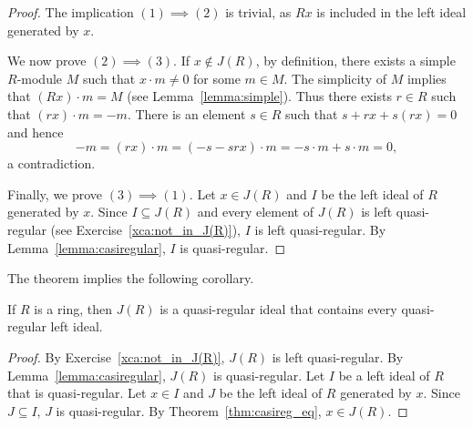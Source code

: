 \begin{proof}
	The implication $(1)\implies(2)$ is trivial, as $Rx$ is included in the left ideal 
	generated by $x$.  
	
	We now prove $(2)\implies(3)$. If
	$x\not\in J(R)$, by definition, there exists a simple 
	$R$-module $M$ such that $x\cdot m\ne 0$ for some $m\in M$. The simplicity of $M$ implies
	that $(Rx)\cdot m=M$ (see Lemma~\ref{lemma:simple}). Thus there exists $r\in R$ such that $(rx)\cdot m=-m$. There is an element 
	$s\in R$ such that $s+rx+s(rx)=0$ and hence 
	\[
	-m=(rx)\cdot m=(-s-srx)\cdot m=-s\cdot m+s\cdot m=0,
	\]
	a contradiction. 
	
	Finally, we prove $(3)\implies(1)$. Let $x\in J(R)$ and $I$ be the left ideal of $R$ 
 generated by $x$. Since $I\subseteq J(R)$ and every element of $J(R)$ is left quasi-regular (see Exercise~\ref{xca:not_in_J(R)}), 
 $I$ is left quasi-regular. By Lemma~\ref{lemma:casiregular}, $I$ is quasi-regular. 
\end{proof}

The theorem implies the following corollary. 

\begin{corollary}
	If $R$ is a ring, then $J(R)$ is a quasi-regular ideal that contains every 
	quasi-regular left ideal. 
\end{corollary}

\begin{proof}
    By Exercise~\ref{xca:not_in_J(R)}, $J(R)$ is left quasi-regular. By Lemma~\ref{lemma:casiregular}, $J(R)$ is quasi-regular. 
    Let $I$ be a left ideal of $R$ that is quasi-regular. Let $x\in I$ and $J$ be the left
    ideal of $R$ generated by $x$. Since $J\subseteq I$, $J$ is quasi-regular. By Theorem~\ref{thm:casireg_eq}, $x\in J(R)$. 
\end{proof}






